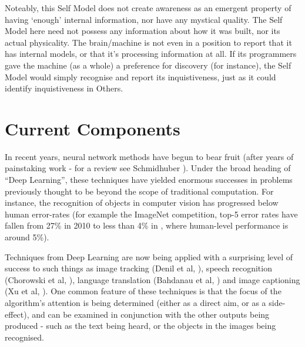 \documentclass[citeauthoryear]{llncs}
\begin{document}
Noteably, this Self Model does not create awareness as an emergent property of 
having `enough' internal information, nor have any mystical quality.  
%
The Self Model here need not possess any information about how it was built, 
nor its actual physicality.  
%
The brain/machine is not even in a position to report that it has internal models, 
or that it's processing information at all.
%
If its programmers gave the machine (as a whole) a preference for discovery (for instance),
the Self Model would simply recognise and report its inquistiveness, just as it 
could identify inquistiveness in Others.

%




\section{Current Components}

In recent years, neural network methods have begun to bear fruit (after years
of painstaking work - for a review see Schmidhuber \cite{SchmidhuberOverview}).
%
Under the broad heading of ``Deep Learning'', these techniques have yielded 
enormous successes in problems previously thought to be beyond the scope of traditional computation.
%
For instance, the recognition of objects in computer vision 
has progressed below human error-rates (for example the ImageNet competition, top-5 error rates
have fallen from 27\% in 2010 to less than 4\% in \cite{MSRresnet}, where human-level performance is around 5\%).

Techniques from Deep Learning are now being applied with a surprising 
level of success to such things as 
image tracking (Denil et al, \cite{VisualAttention}), 
speech recognition (Chorowski et al, \cite{SpeechAttention}), 
language translation (Bahdanau et al, \cite{TranslationAttention}) 
and image captioning (Xu et al, \cite{ImageCaptioning}).
%
One common feature of these techniques is that
the focus of the algorithm's attention is being determined 
(either as a direct aim, or as a side-effect), 
and can be examined in conjunction with the other outputs being produced - 
such as the text being heard, or the objects in the images being recognised.
\end{document}
